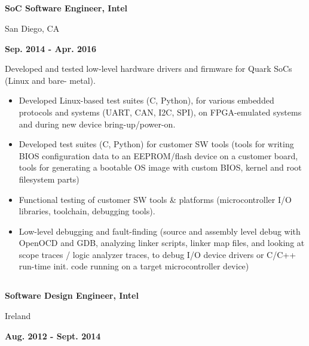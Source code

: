 \documentclass[6pt]{article}
\begin{document}
\begin{minipage}{50em}
\begin{minipage}{20em}
%
%
\subsection*{}
{\bfseries SoC Software Engineer, Intel

San Diego, CA}

\end{minipage}
\hfill
\begin{minipage}{28em}
{
    \bfseries \hfill Sep. 2014 - Apr. 2016

}
\end{minipage}
\break
\break
Developed and tested low-level hardware drivers and firmware for Quark SoCs (Linux and bare-
metal).
\begin{itemize}
    \item Developed Linux-based test suites (C, Python), for various embedded protocols and
          systems (UART, CAN, I2C, SPI), on FPGA-emulated systems and during new device
          bring-up/power-on.
    \item Developed test suites (C, Python) for customer SW tools (tools for writing BIOS
          configuration data to an EEPROM/flash device on a customer board, tools for
          generating a bootable OS image with custom BIOS, kernel and root filesystem parts)
    \item Functional testing of customer SW tools \& platforms (microcontroller I/O libraries, toolchain,
          debugging tools).
    \item Low-level debugging and fault-finding (source and assembly level debug with OpenOCD and GDB,
          analyzing linker scripts, linker map files, and looking at scope traces / logic analyzer traces, to
          debug I/O device drivers or C/C++ run-time init. code running on a target microcontroller device)
\end{itemize}

\hspace*{-\parindent}%
\begin{minipage}{20em}
%
%
\subsection*{}
{\bfseries Software Design Engineer, Intel

Ireland}

\end{minipage}
\hfill
\begin{minipage}{14em}
{
    \bfseries \hfill Aug. 2012 - Sept. 2014

}
\end{minipage}
\end{minipage}
\end{document}
